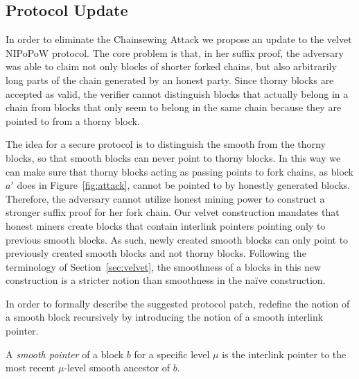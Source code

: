 \subsection{Protocol Update}
In order to eliminate the Chainsewing Attack we propose an update to the velvet NIPoPoW protocol. The core problem is that, in her suffix proof, the adversary was able to claim not only blocks of shorter forked chains, but also arbitrarily long parts of the chain generated by an honest party. Since thorny blocks are accepted as valid, the verifier cannot distinguish blocks that actually belong in a chain from blocks that only seem to belong in the same chain because they are pointed to from a thorny block.

The idea for a secure protocol is to distinguish the smooth from the thorny blocks, so that smooth blocks can never point to thorny blocks. In this way we can make sure that thorny blocks acting as passing points to fork chains, as block $a'$ does in Figure~\ref{fig:attack}, cannot be pointed to by honestly generated blocks. Therefore, the adversary cannot utilize honest mining power to construct a stronger suffix proof for her fork chain. Our velvet construction mandates that honest miners create blocks that contain interlink pointers pointing only to previous smooth blocks. As such, newly created smooth blocks can only point to previously created smooth blocks and not thorny blocks. Following the terminology of Section~\ref{sec:velvet}, the smoothness of a blocks in this new construction is a stricter notion than smoothness in the na\"ive construction.

In order to formally describe the suggested protocol patch, redefine the notion of a smooth block recursively by introducing the notion of a smooth interlink pointer.

\begin{definition}
  A \emph{smooth pointer} of a block $b$ for a specific level $\mu$ is the interlink pointer to the most recent $\mu$-level smooth ancestor of $b$.
	\label{defn:smooth_pointer}
\end{definition}

